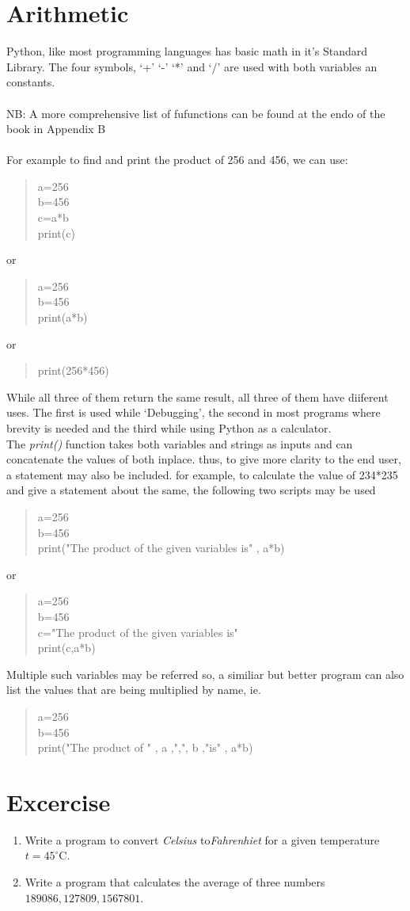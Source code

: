\section{Arithmetic}
Python, like most programming languages has basic math in it's Standard Library. The four symbols, `+' `-' `*' and `/' are used with both variables an constants.
\\ \\ NB: A more comprehensive list of fufunctions can be found at the endo of the book in Appendix B\\ \\
 For example to find and print the product of 256 and 456, we can use:
\begin{quote}
a=256\\b=456\\c=a*b\\print(c)
\end{quote}
or
\begin{quote}
a=256\\b=456\\print(a*b)
\end{quote}
or
\begin{quote}
print(256*456)
\end{quote}
While all three of them return the same result, all three of them have diiferent uses. The first is used while `Debugging', the second in most programs where brevity is needed and the third while using Python as a calculator.\\
The  \emph{print()} function takes both variables and strings as inputs and can concatenate the values of both inplace. thus, to give more clarity to the end user, a statement may also be included. for example, to calculate the value of 234*235 and give a statement about the same, the following two scripts may be used
\begin{quote}
a=256\\b=456\\print("The product of the given variables is" ,  a*b)
\end{quote}
or
\begin{quote}
a=256\\b=456\\c="The product of the given variables is"  \\print(c,a*b)
\end{quote}
Multiple such variables may be referred so, a similiar but better program can also list the values that are being multiplied by name, ie.  
\begin{quote}
a=256\\b=456\\print("The product of " , a ,",", b ,"is" ,  a*b)
\end{quote}
\section{Excercise}
\begin{enumerate}
\item Write a program to convert \emph{Celsius} to\emph{Fahrenhiet} for a given temperature $t=45^{\circ}$C.
\item Write a program that calculates the average of three numbers $189086,127809,1567801$.
\end{enumerate}

